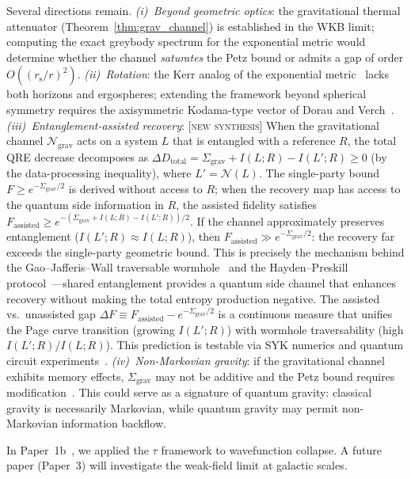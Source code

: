 \documentclass[prl,twocolumn,superscriptaddress,longbibliography,floatfix]{revtex4-2}
\newcommand{\chan}{\mathcal{N}}
\newcommand{\tauasym}{\tau}
\newcommand{\rs}{r_{\mathrm{s}}}
\newcommand{\Sgrav}{\Sigma_{\mathrm{grav}}}
\begin{document}
Several directions remain.
\emph{(i)~Beyond geometric optics}: the gravitational thermal
attenuator (Theorem~\ref{thm:grav_channel}) is established in
the WKB limit; computing the exact greybody spectrum for the
exponential metric would determine whether the channel
\emph{saturates} the Petz bound or admits a gap of order
$O((\rs/r)^2)$.
\emph{(ii)~Rotation}: the Kerr analog of the exponential
metric~\cite{Graber2017,MakukovMychelkin2023} lacks both
horizons and ergospheres; extending the framework beyond
spherical symmetry requires the axisymmetric
Kodama-type vector of Dorau and
Verch~\cite{DorauVerch2024}.
\emph{(iii)~Entanglement-assisted recovery}:
[\textsc{new synthesis}]  When the gravitational channel
$\chan_{\mathrm{grav}}$ acts on a system $L$ that is entangled
with a reference $R$, the total QRE decrease decomposes as
$\Delta D_{\mathrm{total}} = \Sgrav + I(L;R) - I(L';R) \geq 0$
(by the data-processing inequality), where $L' = \chan(L)$.
The single-party bound $F \geq e^{-\Sgrav/2}$ is derived
without access to $R$; when the recovery map has access to the
quantum side information in $R$, the assisted fidelity satisfies
$F_{\mathrm{assisted}} \geq
e^{-(\Sgrav + I(L;R) - I(L';R))/2}$.
If the channel approximately preserves entanglement
($I(L';R) \approx I(L;R)$), then
$F_{\mathrm{assisted}} \gg e^{-\Sgrav/2}$:
the recovery far exceeds the single-party geometric bound.
This is precisely the mechanism behind the Gao--Jafferis--Wall
traversable wormhole~\cite{GaoJafferisWall2017} and the
Hayden--Preskill protocol~\cite{HaydenPreskill2007}---shared
entanglement provides a quantum side channel that enhances
recovery without making the total entropy production negative.
The assisted vs.\ unassisted gap
$\Delta F \equiv F_{\mathrm{assisted}} - e^{-\Sgrav/2}$
is a continuous measure that unifies the Page curve transition
(growing $I(L';R)$) with wormhole traversability
(high $I(L';R)/I(L;R)$).
This prediction is testable via SYK numerics and quantum
circuit experiments~\cite{Jafferis2022}.
\emph{(iv)~Non-Markovian gravity}: if the gravitational
channel exhibits memory effects, $\Sgrav$ may not be additive
and the Petz bound requires
modification~\cite{LandiPaternostro2021}.
This could serve as a signature of quantum gravity:
classical gravity is necessarily Markovian, while quantum
gravity may permit non-Markovian information backflow.

In Paper~1b~\cite{Paper1b}, we applied the $\tauasym$ framework
to wavefunction collapse.
A future paper (Paper~3) will investigate the weak-field limit
at galactic scales.
\end{document}
